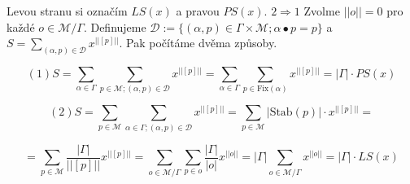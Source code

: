 \begin{dukaz}
	Levou stranu si označím $LS(x)$ a pravou $PS(x)$. $2 \Rightarrow 1$ Zvolme $||o|| = 0$ pro každé $o \in \mathcal{M}/\Gamma$. Definujeme $\mathcal{D} := \{(\alpha ,p) \in \Gamma \times \mathcal{M}; \alpha \bullet p = p\}$ a $S = \sum_{(\alpha, p) \in \mathcal{D}}x^{||[p]||}$. Pak počítáme dvěma způsoby.
	
	$$
	(1) S = \sum_{\alpha \in \Gamma} \sum_{p \in \mathcal{M}; (\alpha,p) \in \mathcal{D}} x^{||[p]||} = \sum_{\alpha \in \Gamma}\sum_{p \in \text{Fix}(\alpha)} x^{||[p]||} = |\Gamma| \cdot PS(x)
	$$
	
	$$
	(2) S = \sum_{p \in \mathcal{M}} \sum_{\alpha \in \Gamma; (\alpha, p) \in \mathcal{D}} x^{||[p]||} = \sum_{p \in \mathcal{M}} |\text{Stab}(p)| \cdot x^{||[p]||} =
	$$
	
	$$
	= \sum_{p \in \mathcal{M}} \frac{|\Gamma|}{||[p]||}x^{||[p]||} = \sum_{o \in \mathcal{M}/\Gamma}\sum_{p \in o} \frac{|\Gamma|}{|o|}x^{||o||} = |\Gamma| \sum_{o \in \mathcal{M}/\Gamma}x^{||o||} = |\Gamma| \cdot LS(x)
	$$
\end{dukaz}